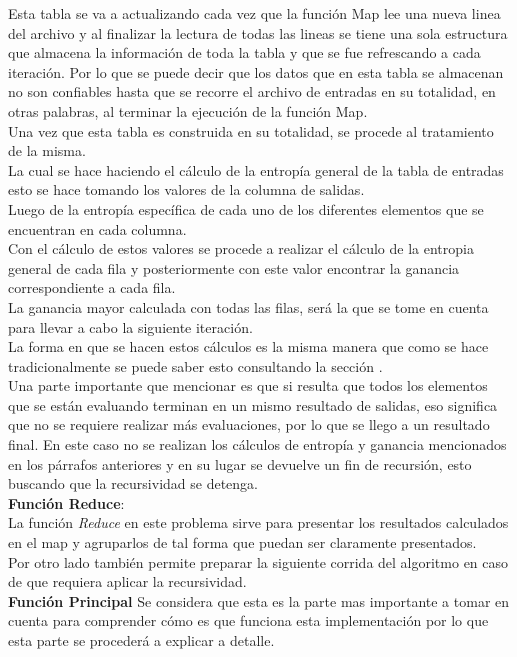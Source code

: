 Esta tabla se va a actualizando cada vez que la función Map lee una nueva linea del archivo y al finalizar la lectura de todas las lineas se tiene una sola estructura que almacena la información de toda la tabla y que se fue refrescando a cada iteración. Por lo que se puede decir que los datos que en esta tabla se almacenan no son confiables hasta que se recorre el archivo de entradas en su totalidad, en otras palabras, al terminar la ejecución de la función Map.\\
Una vez que esta tabla es construida en su totalidad, se procede al tratamiento de la misma. \\
La cual se hace haciendo el cálculo de la entropía general de la tabla de entradas esto se hace tomando los valores de la columna de salidas. \\
Luego de la entropía específica de cada uno de los diferentes elementos que se encuentran en cada columna.\\
Con el cálculo de estos valores se procede a realizar el cálculo de la entropia general de cada fila y posteriormente con este valor encontrar la ganancia correspondiente a cada fila. \\
La ganancia mayor calculada con todas las filas, será la que se tome en cuenta para llevar a cabo la siguiente iteración.\\
La forma en que se hacen estos cálculos es la misma manera que como se hace tradicionalmente se puede saber esto consultando la sección .\\ 
Una parte importante que mencionar es que si resulta que todos los elementos que se están evaluando terminan en un mismo resultado de salidas, eso significa que no se requiere realizar más evaluaciones, por lo que se llego a un resultado final. En este caso no se realizan los cálculos de entropía y ganancia mencionados en los párrafos anteriores y en su lugar se devuelve un fin de recursión, esto buscando que la recursividad se detenga.\\
\textbf{Función Reduce}: 
\\
La función \emph{Reduce} en este problema sirve para presentar los resultados calculados en el map y agruparlos de tal forma que puedan ser claramente presentados. \\
Por otro lado también permite preparar la siguiente corrida del algoritmo en caso de que requiera aplicar la recursividad.\\
\textbf{Función Principal}
Se considera que esta es la parte mas importante a tomar en cuenta para comprender cómo es que funciona esta implementación por lo que esta parte se procederá a explicar a detalle.
